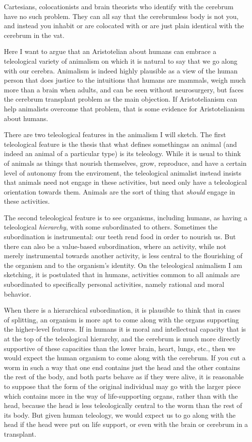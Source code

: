 Cartesians, colocationists and brain theorists who identify with the cerebrum have no such problem. They can all say that
the cerebrumless body is not you, and instead you inhabit or are colocated with or are just plain identical with the cerebrum
in the vat. 

Here I want to argue that an Aristotelian about humans can embrace a teleological variety of animalism on which it is natural to say that 
we go along with our cerebra. Animalism is indeed highly plausible as 
a view of the human person that does justice to the intuitions that humans are mammals, weigh much more than a brain 
when adults, and can be seen without neurosurgery, but faces the cerebrum transplant problem as the main objection. 
If Aristotelianism can help animalists overcome that problem, that is some evidence for Aristotelianism about humans.

There are two teleological features in the animalism I will sketch. The first teleological feature is the thesis 
that what defines somethingas an animal (and indeed an animal of a particular type) is its teleology. While it is usual to 
think of animals as things that nourish themselves, grow, reproduce, and have a certain level of autonomy from the enviroment, 
the teleological animalist instead insists that animals need not engage in these activities, but need only have a teleological
orientation towards them. Animals are the sort of thing that \textit{should} engage in these activities. 

The second teleological feature is to see organisms, including humans, as having a teleological \textit{hierarchy}, with some
\tele{} subordinated to others. Sometimes the subordination is instrumental: our teeth rend food in order to nourish us. 
But there can also be a value-based subordination, where an activity, while not merely instrumental towards another activity, 
is less central to the flourishing of the organism and to the organism's identity. On the teleological animalism I am sketching,
it is postulated that in humans, activities common to all animals are subordinated to specifically personal activities, namely 
rational and moral behavior. 

When there is a hierarchical subordination, it is plausible to think that in cases of splitting, an organism is more apt
to come along with the organs supporting the higher-level features. If in humans it is moral and intellectual capacity 
that is at the top of the teleological hierarchy, and the cerebrum is much more directly supportive of these capacities
than the lower brain, heart, lungs, etc., then we would expect the human organism to come along with the cerebrum. If you
cut a worm in such a way that one end contains just the head and the other contains the rest of the body, and both parts
behave as if they were alive, it is reasonable to suppose that the form of the original individual may go with the larger
piece which contains more in the way of life-supporting organs, rather than with the head, because the head is less 
teleologically central to the worm than the rest of its body. But given human teleology, we would expect us to go along 
with the head if the head were put on life support, or even with the brain or cerebrum in a transplant.

